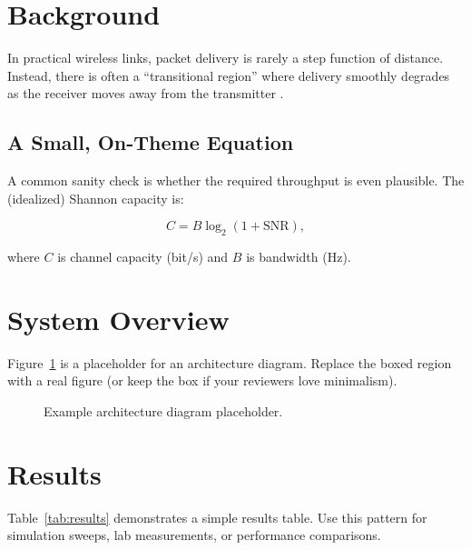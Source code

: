 \documentclass[
    left=1.5in,
    right=1.25in,
    top=1.25in,
    bottom=1.25in
]{CalPolySeniorProject}
\begin{document}
\section{Background}

In practical wireless links, packet delivery is rarely a step function of
distance. Instead, there is often a ``transitional region'' where delivery
smoothly degrades as the receiver moves away from the transmitter
\autocite{zuniga2004transitional}.

\subsection{A Small, On-Theme Equation}

A common sanity check is whether the required throughput is even plausible.
The (idealized) Shannon capacity is:

\begin{equation}
    C = B \log_2\!\left(1 + \mathrm{SNR}\right),
    \label{eq:shannon_capacity}
\end{equation}

where \(C\) is channel capacity (bit/s) and \(B\) is bandwidth (Hz).

\section{System Overview}

Figure~\ref{fig:arch} is a placeholder for an architecture diagram. Replace
the boxed region with a real figure (or keep the box if your reviewers love
minimalism).

\begin{figure}[!ht]
    \centering
    \caption[Architecture diagram placeholder]{Example architecture diagram
    placeholder.}
    \label{fig:arch}
\end{figure}

\section{Results}

Table~\ref{tab:results} demonstrates a simple results table. Use this pattern
for simulation sweeps, lab measurements, or performance comparisons.
\end{document}
